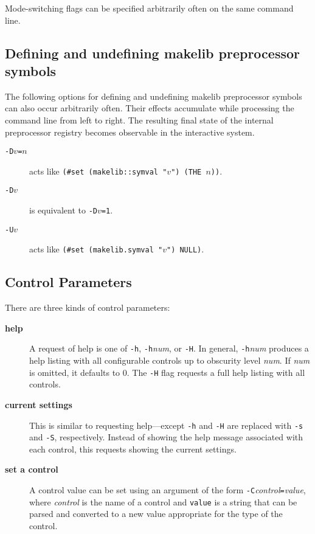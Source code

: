 Mode-switching flags can be specified arbitrarily often on the same
command line.

\subsection{Defining and undefining makelib preprocessor symbols}
\label{sec:cmdline:defundef}

The following options for defining and undefining makelib preprocessor
symbols can also occur arbitrarily often.  Their effects accumulate
while processing the command line from left to right.  The resulting
final state of the internal preprocessor registry becomes observable
in the interactive system.

\begin{description}
\item[{\tt -D$v$=$n$}] acts like {\tt (\#set (makelib::symval "$v$") (THE $n$))}.
\item[{\tt -D$v$}] is equivalent to {\tt -D$v$=1}.
\item[{\tt -U$v$}] acts like {\tt (\#set (makelib.symval "$v$") NULL)}.
\end{description}

\subsection{Control Parameters}

There are three kinds of control parameters:

\begin{description}
\item[{\bf help}] A request of help is one of {\tt -h},
{\tt -h}{\it num}, or {\tt -H}.  In general, {\tt -h}{\it num}
produces a help listing with all configurable controls up to obscurity
level {\it num}.  If {\it num} is omitted, it defaults to 0.  The
{\tt -H} flag requests a full help listing with all controls.
\item[{\bf current settings}] This is similar to requesting
help---except {\tt -h} and {\tt -H} are replaced with {\tt -s} and
{\tt -S}, respectively.  Instead of showing the help message
associated with each control, this requests showing the current
settings.
\item[{\bf set a control}] A control value can be set using an
argument of the form {\tt -C}{\it control}{\tt =}{\it value}, where
{\it control} is the name of a control and {\tt value} is a string
that can be parsed and converted to a new value appropriate for the
type of the control.
\end{description}
